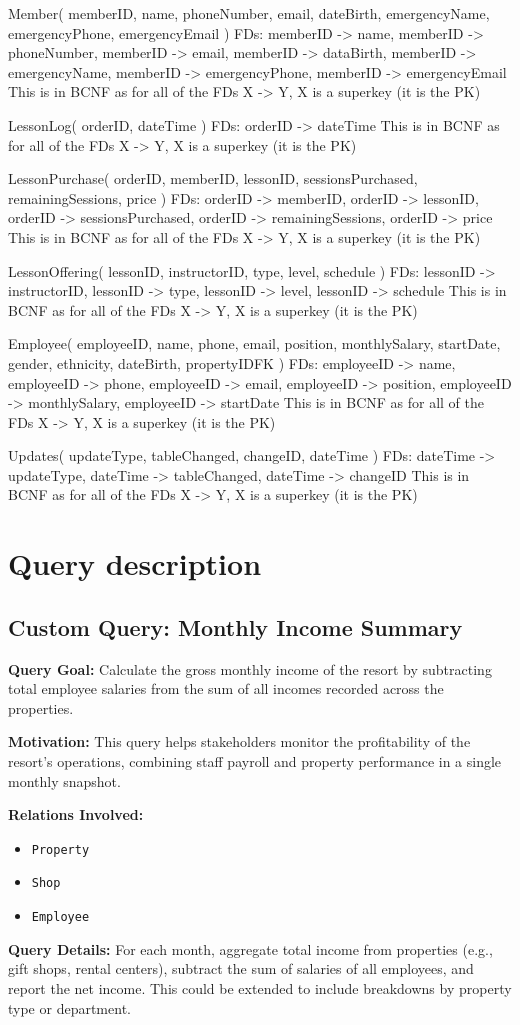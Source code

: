 \documentclass[11pt]{scrartcl}
\begin{document}
Member( memberID, name, phoneNumber, email, dateBirth, emergencyName, emergencyPhone, emergencyEmail )
FDs: memberID -> name, memberID -> phoneNumber, memberID -> email, memberID -> dataBirth,
     memberID -> emergencyName, memberID -> emergencyPhone, memberID -> emergencyEmail
This is in BCNF as for all of the FDs X -> Y, X is a superkey (it is the PK)

LessonLog( orderID, dateTime )
FDs: orderID -> dateTime
This is in BCNF as for all of the FDs X -> Y, X is a superkey (it is the PK)

LessonPurchase( orderID, memberID, lessonID, sessionsPurchased, remainingSessions, price )
FDs: orderID -> memberID, orderID -> lessonID, orderID -> sessionsPurchased, orderID -> remainingSessions,
     orderID -> price
This is in BCNF as for all of the FDs X -> Y, X is a superkey (it is the PK)

LessonOffering( lessonID, instructorID, type, level, schedule )
FDs: lessonID -> instructorID, lessonID -> type, lessonID -> level, lessonID -> schedule
This is in BCNF as for all of the FDs X -> Y, X is a superkey (it is the PK)

Employee( employeeID, name, phone, email, position, monthlySalary, startDate,
gender, ethnicity, dateBirth, propertyIDFK )
FDs: employeeID -> name, employeeID -> phone, employeeID -> email, employeeID -> position,
     employeeID -> monthlySalary, employeeID -> startDate
This is in BCNF as for all of the FDs X -> Y, X is a superkey (it is the PK)

Updates( updateType, tableChanged, changeID, dateTime )
FDs: dateTime -> updateType, dateTime -> tableChanged, dateTime -> changeID
This is in BCNF as for all of the FDs X -> Y, X is a superkey (it is the PK)

\section{Query description}
\subsection{Custom Query: Monthly Income Summary}

\textbf{Query Goal:} Calculate the gross monthly income of the resort by subtracting total employee salaries from the sum of all incomes recorded across the properties.

\textbf{Motivation:} This query helps stakeholders monitor the profitability of the resort’s operations, combining staff payroll and property performance in a single monthly snapshot.

\textbf{Relations Involved:}
\begin{itemize}
  \item \texttt{Property}
  \item \texttt{Shop}
  \item \texttt{Employee}
\end{itemize}

\textbf{Query Details:} For each month, aggregate total income from properties (e.g., gift shops, rental centers), subtract the sum of salaries of all employees, and report the net income. This could be extended to include breakdowns by property type or department.
\end{document}
